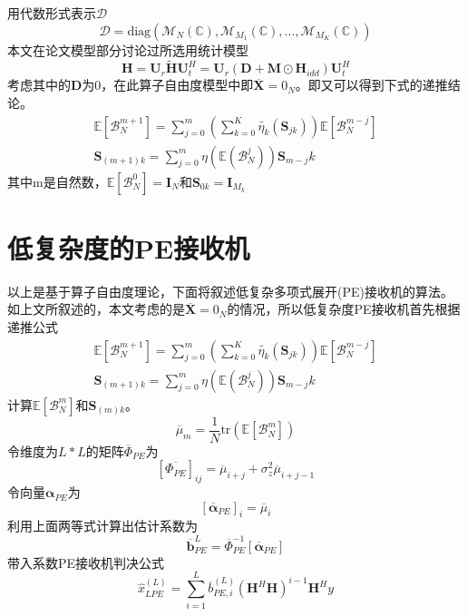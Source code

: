 \documentclass[bachelor,nocolorlinks, printoneside]{seuthesis} %
\begin{document}
\begin{Main}
用代数形式表示$\mathcal{D}$
\begin{equation}\label{key}
\mathcal{D} = \mathrm{diag}(\mathcal{M}_N(\mathbb{C}),\mathcal{M}_{M_1}(\mathbb{C}),...,\mathcal{M}_{M_K}(\mathbb{C}))
\end{equation}
本文在论文模型部分讨论过所选用统计模型
\begin{equation}\label{key}
\mathbf{H} = \mathbf{U}_{r}\tilde{\mathbf{H}}\mathbf{U}_{t}^{H} = \mathbf{U}_{r}(\mathbf{D}+\mathbf{M}\odot \mathbf{H}_{idd})\mathbf{U}_{t}^{H}
\end{equation}
考虑其中的$\mathbf{D}$为0，在此算子自由度模型中即$\overline{\mathbf{X}} = 0_N$。即又可以得到下式的递推结论。
\begin{gather}\label{key}
\mathbb{E}[\mathcal{B}^{m+1}_N] = \sum_{j=0}^{m}(\sum_{k=0}^{K}\tilde{\eta_k}(\mathbf{S}_{jk}))\mathbb{E}[\mathcal{B}_N^{m-j}] \\
\mathbf{S}_{(m+1)k} =\sum_{j=0}^{m}\eta(\mathbb{E}(\mathcal{B}_N^j))\mathbf{S}_{m-j}k
\end{gather}
其中m是自然数，$\mathbb{E}[\mathcal{B}_N^0]=\mathbf{I}_N$和$\mathbf{S}_{0k}=\mathbf{I}_{M_k}$

\section{低复杂度的PE接收机}
以上是基于算子自由度理论，下面将叙述低复杂多项式展开(PE)接收机的算法。如上文所叙述的，本文考虑的是$\overline{\mathbf{X}} = 0_N$的情况，所以低复杂度PE接收机首先根据递推公式
\begin{gather}\label{key}
\mathbb{E}[\mathcal{B}^{m+1}_N] = \sum_{j=0}^{m}(\sum_{k=0}^{K}\tilde{\eta_k}(\mathbf{S}_{jk}))\mathbb{E}[\mathcal{B}_N^{m-j}] \\
\mathbf{S}_{(m+1)k} =\sum_{j=0}^{m}\eta(\mathbb{E}(\mathcal{B}_N^j))\mathbf{S}_{m-j}k
\end{gather}
计算$\mathbb{E}[\mathcal{B}_N^{m}]$和$\mathbf{S}_{(m)k}$。
\begin{equation}\label{key}
\overline{\mu}_{m} = \frac{1}{N} \mathrm{tr}(\mathbb{E}[\mathcal{B}_N^{m}])
\end{equation}
令维度为$L*L$的矩阵$\overline{\Phi}_{PE}$为
\begin{equation}\label{key}
[\overline{\Phi_{PE}}]_{ij} = \overline{\mu}_{i+j} + \sigma_z^2 \overline{\mu}_{i+j-1}
\end{equation}
令向量$\bm{\alpha}_{PE}$为
\begin{equation}\label{key}
[\overline{\bm{\alpha}}_{PE}]_i = \overline{\mu}_i
\end{equation}
利用上面两等式计算出估计系数为
\begin{equation}\label{key}
\overline{\mathbf{b}}_{PE}^{L} = \overline{\Phi}_{PE}^{-1} [\overline{\bm{\alpha}}_{PE}]
\end{equation}
带入系数PE接收机判决公式
\begin{equation}\label{key}
\hat{x}_{LPE}^{(L)} = \sum_{i=1}^{L}\overline{b}_{PE,i}^{(L)}(\mathbf{H}^H\mathbf{H})^{i-1}  \mathbf{H}^H y
\end{equation}


\end{Main}
\end{document}
